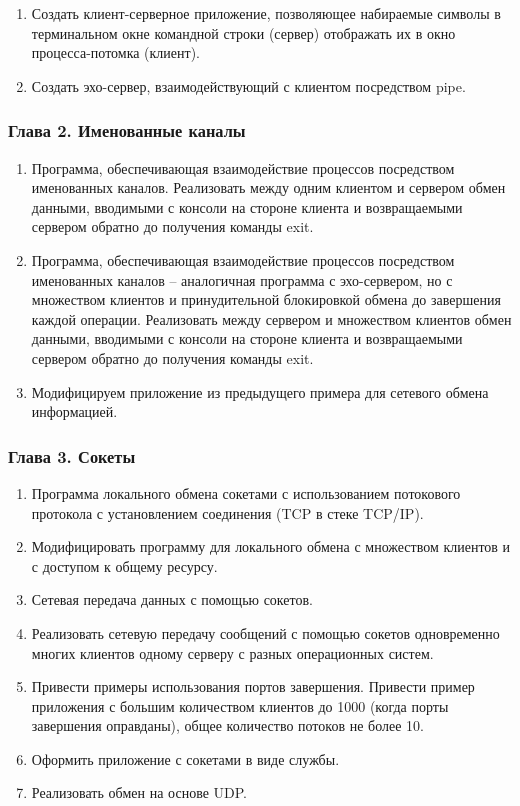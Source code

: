 \documentclass[14pt,a4paper,report]{report}
\begin{document}
\begin{enumerate}
	\item Создать клиент-серверное приложение, позволяющее набираемые символы в терминальном окне командной строки (сервер) отображать их в окно процесса-потомка (клиент).
	\item Создать эхо-сервер, взаимодействующий с клиентом посредством pipe.
\end{enumerate}

\subsubsection{Глава 2. Именованные каналы}

\begin{enumerate}
	\item Программа, обеспечивающая взаимодействие процессов посредством именованных каналов. Реализовать между одним клиентом и сервером обмен данными, вводимыми с консоли на стороне клиента и возвращаемыми сервером обратно до получения команды exit.
	\item Программа, обеспечивающая взаимодействие процессов посредством именованных каналов – аналогичная программа с эхо-сервером, но с множеством клиентов и принудительной блокировкой обмена до завершения каждой операции. Реализовать между сервером и множеством клиентов обмен данными, вводимыми с консоли на стороне клиента и возвращаемыми сервером обратно до получения команды exit.
	\item Модифицируем приложение из предыдущего примера для сетевого обмена информацией.
\end{enumerate}

\subsubsection{Глава 3. Сокеты}

\begin{enumerate}
	\item Программа локального обмена сокетами с использованием потокового протокола с установлением соединения (TCP в стеке TCP/IP).
	\item Модифицировать программу для локального обмена с множеством клиентов и с доступом к общему ресурсу.
	\item Сетевая передача данных с помощью сокетов.
	\item Реализовать сетевую передачу сообщений с помощью сокетов одновременно многих клиентов одному серверу с разных операционных систем.
	\item Привести примеры использования портов завершения. Привести пример приложения с большим количеством клиентов до 1000 (когда порты завершения оправданы), общее количество потоков не более 10.
	\item Оформить приложение с сокетами в виде службы.
	\item Реализовать обмен на основе UDP.
\end{enumerate}
\end{document}
